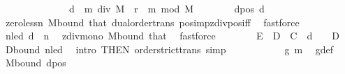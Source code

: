 \begin{isabellebody}
\ \ \ \ \isamarkupfalse%
\ {\isacharminus}{\kern0pt}\isanewline
\ \ \ \ \ \ \isamarkupfalse%
\ {\isacharquery}{\kern0pt}d\ {\isacharequal}{\kern0pt}\ {\isachardoublequoteopen}m\ div\ M{\isachardoublequoteclose}\ \ {\isacharquery}{\kern0pt}r\ {\isacharequal}{\kern0pt}\ {\isachardoublequoteopen}m\ mod\ M{\isachardoublequoteclose}\isanewline
\ \ \ \ \ \ \isamarkupfalse%
\ d{\isacharunderscore}{\kern0pt}pos{\isacharcolon}{\kern0pt}\ {\isachardoublequoteopen}{\isacharquery}{\kern0pt}d\ {\isachargreater}{\kern0pt}\ {}{\isachardoublequoteclose}\ \isamarkupfalse%
\ zero{\isacharunderscore}{\kern0pt}less{\isacharunderscore}{\kern0pt}n\ M{\isacharunderscore}{\kern0pt}bound\ that\ dual{\isacharunderscore}{\kern0pt}order{\isachardot}{\kern0pt}trans\ pos{\isacharunderscore}{\kern0pt}imp{\isacharunderscore}{\kern0pt}zdiv{\isacharunderscore}{\kern0pt}pos{\isacharunderscore}{\kern0pt}iff\ \isamarkupfalse%
\ fastforce\isanewline
\ \ \ \ \ \ \isamarkupfalse%
\ n{\isacharunderscore}{\kern0pt}le{\isacharunderscore}{\kern0pt}d{\isacharcolon}{\kern0pt}\ {\isachardoublequoteopen}{\isacharquery}{\kern0pt}d\ {\isasymge}\ n{\isachardoublequoteclose}\ \isamarkupfalse%
\ zdiv{\isacharunderscore}{\kern0pt}mono{}\ M{\isacharunderscore}{\kern0pt}bound\ that\ \isamarkupfalse%
\ fastforce\isanewline
\ \ \ \ \ \ \isamarkupfalse%
\ {\isachardoublequoteopen}E\ {\isacharplus}{\kern0pt}\ D\ {\isacharplus}{\kern0pt}\ C\ {\isacharless}{\kern0pt}\ {\isacharparenleft}{\kern0pt}{\isacharquery}{\kern0pt}d\ {\isacharplus}{\kern0pt}\ {}{\isacharparenright}{\kern0pt}\ {\isacharasterisk}{\kern0pt}\ D{\isachardoublequoteclose}\ \isamarkupfalse%
\ D{\isacharunderscore}{\kern0pt}bound\ n{\isacharunderscore}{\kern0pt}le{\isacharunderscore}{\kern0pt}d\ \isamarkupfalse%
\ {\isacharparenleft}{\kern0pt}intro\ {\isacharasterisk}{\kern0pt}{\isacharbrackleft}{\kern0pt}THEN\ order{\isachardot}{\kern0pt}strict{\isacharunderscore}{\kern0pt}trans{}{\isacharbrackright}{\kern0pt}{\isacharparenright}{\kern0pt}\ simp\isanewline
\ \ \ \ \ \ \isamarkupfalse%
\ \isamarkupfalse%
\ {\isachardoublequoteopen}{\isachardot}{\kern0pt}{\isachardot}{\kern0pt}{\isachardot}{\kern0pt}\ {\isasymle}\ g\ m{\isachardoublequoteclose}\ \isamarkupfalse%
\ g{\isacharunderscore}{\kern0pt}def\ \isamarkupfalse%
\ M{\isacharunderscore}{\kern0pt}bound\ d{\isacharunderscore}{\kern0pt}pos\ \isamarkupfalse%

\end{isabellebody}
